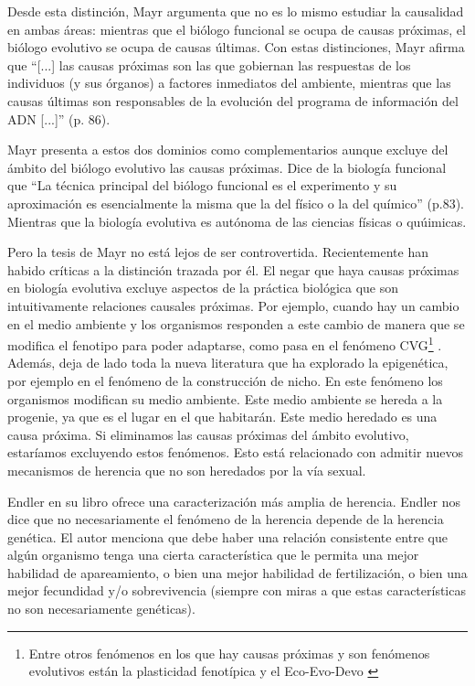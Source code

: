Desde esta distinción, Mayr argumenta que no es lo mismo estudiar la causalidad en ambas áreas: mientras que el biólogo funcional se ocupa de causas próximas, el biólogo evolutivo se ocupa de causas últimas. Con estas distinciones, Mayr afirma que ``[...] las causas próximas son las que gobiernan las respuestas de los individuos (y sus órganos) a factores inmediatos del ambiente, mientras que las causas últimas son responsables de la evolución del programa de información del ADN [...]'' (p. 86).

Mayr presenta a estos dos dominios como complementarios aunque excluye del ámbito del biólogo evolutivo las causas próximas. Dice de la biología funcional que ``La técnica principal del biólogo funcional es el experimento y su aproximación es esencialmente la misma que la del físico o la del químico'' (p.83). Mientras que la biología evolutiva es autónoma de las ciencias físicas o quúimicas.

Pero la tesis de Mayr no está lejos de ser controvertida. Recientemente han habido críticas a la distinción trazada por él. El negar que haya causas próximas en biología evolutiva excluye aspectos de la práctica biológica que son intuitivamente relaciones causales próximas. Por ejemplo, cuando hay un cambio en el medio ambiente y los organismos responden a este cambio de manera que se modifica el fenotipo para poder adaptarse, como pasa en el fenómeno CVG\footnote{Entre otros fenómenos en los que hay causas próximas y son fenómenos evolutivos están la plasticidad fenotípica \cite{WESTEBERHARD20082701} y el Eco-Evo-Devo \cite{PfenningEco-Evo-Devo}} \cite{CVG}. Además, deja de lado toda la nueva literatura que ha explorado la epigenética, por ejemplo en el fenómeno de la construcción de nicho. En este fenómeno los organismos modifican su medio ambiente. Este medio ambiente se hereda a la progenie, ya que es el lugar en el que habitarán. Este medio heredado es una causa próxima. Si eliminamos las causas próximas del ámbito evolutivo, estaríamos excluyendo estos fenómenos. Esto está relacionado con admitir nuevos mecanismos de herencia que no son heredados por la vía sexual.

Endler en su libro \citeyear{Endler1986} ofrece una caracterización más amplia de herencia. Endler nos dice que no necesariamente el fenómeno de la herencia depende de la herencia genética. El autor menciona que debe haber una relación consistente entre que algún organismo tenga una cierta característica que le permita una mejor habilidad de apareamiento, o bien una mejor habilidad de fertilización, o bien una mejor fecundidad y/o sobrevivencia (siempre con miras a que estas características no son necesariamente genéticas).

